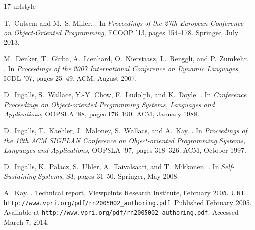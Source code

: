\documentclass{sigplanconf}
\begin{document}
{

\begin{thebibliography}{17}
\providecommand{\natexlab}[1]{#1}
\providecommand{\url}[1]{\texttt{#1}}
\expandafter\ifx\csname urlstyle\endcsname\relax
  \providecommand{\doi}[1]{doi: #1}\else
  \providecommand{\doi}{doi: \begingroup \urlstyle{rm}\Url}\fi

T.~Cutsem and M.~S. Miller.
.
\newblock In \emph{{Proceedings of the 27th European Conference on
  Object-Oriented Programming}}, ECOOP '13, pages 154--178. Springer, July
  2013.

M.~Denker, T.~G\^{\i}rba, A.~Lienhard, O.~Nierstrasz, L.~Renggli, and
  P.~Zumkehr.
.
\newblock In \emph{{Proceedings of the 2007 International Conference on Dynamic
  Languages}}, ICDL '07, pages 25--49. ACM, August 2007.

D.~Ingalls, S.~Wallace, Y.-Y. Chow, F.~Ludolph, and K.~Doyle.
.
\newblock In \emph{{Conference Proceedings on Object-oriented Programming
  Systems, Languages and Applications}}, OOPSLA '88, pages 176--190. ACM,
  January 1988.

D.~Ingalls, T.~Kaehler, J.~Maloney, S.~Wallace, and A.~Kay.
.
\newblock In \emph{{Proceedings of the 12th ACM SIGPLAN Conference on
  Object-oriented Programming Systems, Languages and Applications}}, OOPSLA
  '97, pages 318--326. ACM, October 1997.

D.~Ingalls, K.~Palacz, S.~Uhler, A.~Taivalsaari, and T.~Mikkonen.
.
\newblock In \emph{{Self-Sustaining Systems}}, S3, pages 31--50. Springer, May
  2008.

A.~Kay.
.
\newblock Technical report, {Viewpoints Research Institute}, February 2005.
\newblock URL \url{http://www.vpri.org/pdf/rn2005002_authoring.pdf}.
\newblock Published February 2005. Available at
  \url{http://www.vpri.org/pdf/rn2005002_authoring.pdf}. Accessed March 7,
  2014.


\end{thebibliography}}
\end{document}
